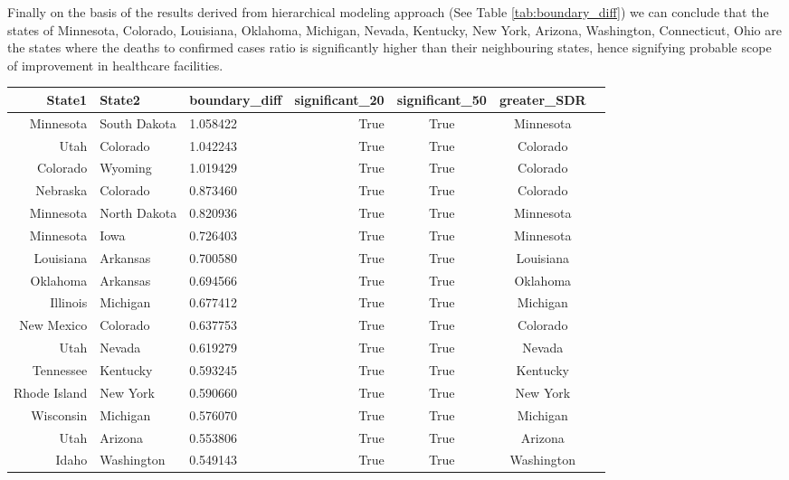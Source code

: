 \documentclass[enabledeprecatedfontcommands,parskip=half,twoside=semi,BCOR=0mm]{scrreprt}
\numberwithin{equation}{chapter}
\theoremstyle{definition}
\theoremstyle{remark}
\begin{document}
    
    Finally on the basis of the results derived from hierarchical modeling approach (See Table \ref{tab:boundary_diff})  we can conclude that the states of Minnesota, Colorado, Louisiana, Oklahoma, Michigan, Nevada, Kentucky, New York, Arizona, Washington, Connecticut, Ohio are the states where the deaths to confirmed cases ratio is significantly higher than their neighbouring states, hence signifying probable scope of improvement in healthcare facilities.
    \begin{table}[h!]
    \centering
    \begin{adjustbox}{max width=\textwidth}
    \begin{tabular}{|r|l|l|r|c|c|l|}
        \hline
        \textbf{State1} & \textbf{State2} & \textbf{boundary\_diff} & \textbf{significant\_20} & \textbf{significant\_50} & \textbf{greater\_SDR} \\
        \hline
        Minnesota & South Dakota & 1.058422 & True & True & Minnesota \\
        Utah & Colorado & 1.042243 & True & True & Colorado \\
        Colorado & Wyoming & 1.019429 & True & True & Colorado \\
        Nebraska & Colorado & 0.873460 & True & True & Colorado \\
        Minnesota & North Dakota & 0.820936 & True & True & Minnesota \\
        Minnesota & Iowa & 0.726403 & True & True & Minnesota \\
        Louisiana & Arkansas & 0.700580 & True & True & Louisiana \\
        Oklahoma & Arkansas & 0.694566 & True & True & Oklahoma \\
        Illinois & Michigan & 0.677412 & True & True & Michigan \\
        New Mexico & Colorado & 0.637753 & True & True & Colorado \\
        Utah & Nevada & 0.619279 & True & True & Nevada \\
        Tennessee & Kentucky & 0.593245 & True & True & Kentucky \\
        Rhode Island & New York & 0.590660 & True & True & New York \\
        Wisconsin & Michigan & 0.576070 & True & True & Michigan \\
        Utah & Arizona & 0.553806 & True & True & Arizona \\
        Idaho & Washington & 0.549143 & True & True & Washington \\

\end{tabular}
\end{adjustbox}
\end{table}
\end{document}
